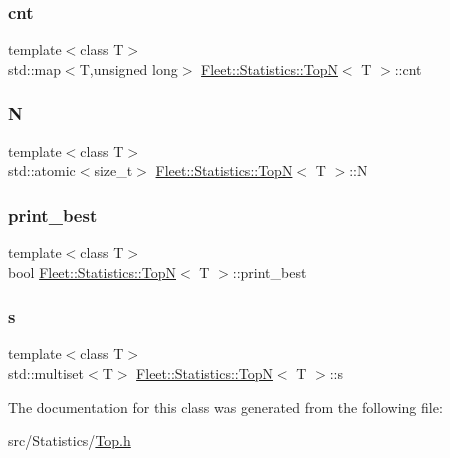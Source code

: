 \subsubsection{\texorpdfstring{cnt}{cnt}}
{\footnotesize\ttfamily template$<$class T$>$ \\
std\+::map$<$T,unsigned long$>$ \hyperlink{class_fleet_1_1_statistics_1_1_top_n}{Fleet\+::\+Statistics\+::\+TopN}$<$ T $>$\+::cnt}

\mbox{\label{class_fleet_1_1_statistics_1_1_top_n_a7a9612e75b42451eef7db77498050e7a}} 
\subsubsection{\texorpdfstring{N}{N}}
{\footnotesize\ttfamily template$<$class T$>$ \\
std\+::atomic$<$size\+\_\+t$>$ \hyperlink{class_fleet_1_1_statistics_1_1_top_n}{Fleet\+::\+Statistics\+::\+TopN}$<$ T $>$\+::N}

\mbox{\label{class_fleet_1_1_statistics_1_1_top_n_a1ee284a643f14a5c4670b4c5f61f5262}} 
\subsubsection{\texorpdfstring{print\+\_\+best}{print\_best}}
{\footnotesize\ttfamily template$<$class T$>$ \\
bool \hyperlink{class_fleet_1_1_statistics_1_1_top_n}{Fleet\+::\+Statistics\+::\+TopN}$<$ T $>$\+::print\+\_\+best}

\mbox{\label{class_fleet_1_1_statistics_1_1_top_n_aa17d03f1154073197161f59657d4c80b}} 
\subsubsection{\texorpdfstring{s}{s}}
{\footnotesize\ttfamily template$<$class T$>$ \\
std\+::multiset$<$T$>$ \hyperlink{class_fleet_1_1_statistics_1_1_top_n}{Fleet\+::\+Statistics\+::\+TopN}$<$ T $>$\+::s}



The documentation for this class was generated from the following file\+:\begin{DoxyCompactItemize}
\item 
src/\+Statistics/\hyperlink{_top_8h}{Top.\+h}\end{DoxyCompactItemize}
